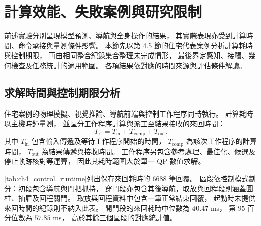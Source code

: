 \section{計算效能、失敗案例與研究限制}
\label{sec:performance_failures_limits}

前述實驗分別呈現模型預測、導航與全身操作的結果，
其實際表現亦受到計算時間、命令承接與量測條件影響。
本節先以第 4.5 節的住宅代表案例分析計算耗時與控制期限，
再由相同整合紀錄集合整理未完成情形，
最後界定感知、接觸、幾何檢查及任務統計的適用範圍。
各項結果依對應的時間來源與評估條件解讀。

\subsection{求解時間與控制期限分析}
\label{subsec:solver_timing_deadline_analysis}

住宅案例的物理模擬、視覺推論、導航前端與控制工作程序同時執行。
計算耗時以主機時鐘量測，
並區分工作程序計算與派工至結果接收的來回時間：
\begin{equation}
    T_{\mathrm{rt}}
    =T_{\mathrm{in}}+T_{\mathrm{comp}}+T_{\mathrm{out}}.
    \label{eq:ch4_control_roundtrip_time}
\end{equation}
其中 $T_{\mathrm{in}}$ 包含輸入傳遞及等待工作程序開始的時間，
$T_{\mathrm{comp}}$ 為該次工作程序的計算時間，
$T_{\mathrm{out}}$ 為結果傳遞與接收時間。
工作程序另包含參考處理、最佳化、候選及停止軌跡核對等運算，
因此其耗時範圍大於單一 QP 數值求解。

\cref{tab:ch4_control_runtime}列出保存來回耗時的 $6688$ 筆回覆。
區段依控制模式劃分：初段包含導航與門把抓持，
穿門段亦包含其後導航，取放與回程段則涵蓋圓柱、抽屜及回程關門。
取放與回程資料中包含一筆正常結束回覆，
起動時未提供來回時間的紀錄則不納入此表。
開門段的來回耗時中位數為 $40.47$ ms，
第 $95$ 百分位數為 $57.85$ ms，
高於其餘三個區段的對應統計值。

